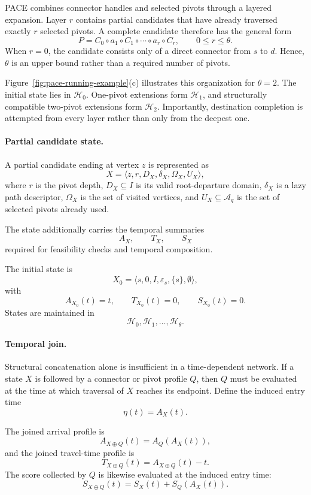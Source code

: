 \documentclass[a4paper,fleqn]{cas-dc}
\begin{document}
PACE combines connector handles and selected pivots through a layered
expansion. Layer \(r\) contains partial candidates that have already traversed
exactly \(r\) selected pivots. A complete candidate therefore has the general
form
\[
P
=
C_0\circ a_1\circ C_1
\circ\cdots\circ
a_r\circ C_r,
\qquad
0\leq r\leq\theta.
\]
When \(r=0\), the candidate consists only of a direct connector from \(s\) to
\(d\). Hence, \(\theta\) is an upper bound rather than a required number of
pivots.

Figure~\ref{fig:pace-running-example}(c) illustrates this organization for
\(\theta=2\). The initial state lies in \(\mathcal H_0\). One-pivot
extensions form \(\mathcal H_1\), and structurally compatible two-pivot
extensions form \(\mathcal H_2\). Importantly, destination completion is
attempted from every layer rather than only from the deepest one.

\paragraph{Partial candidate state.}
A partial candidate ending at vertex \(z\) is represented as
\[
X
=
\langle
z,r,D_X,\delta_X,\Omega_X,U_X
\rangle,
\]
where \(r\) is the pivot depth, \(D_X\subseteq I\) is its valid
root-departure domain, \(\delta_X\) is a lazy path descriptor,
\(\Omega_X\) is the set of visited vertices, and
\(U_X\subseteq\mathcal A_q\) is the set of selected pivots already used.

The state additionally carries the temporal summaries
\[
A_X,\qquad T_X,\qquad S_X
\]
required for feasibility checks and temporal composition.

The initial state is
\[
X_0
=
\langle
s,0,I,\varepsilon_s,\{s\},\emptyset
\rangle,
\]
with
\[
A_{X_0}(t)=t,
\qquad
T_{X_0}(t)=0,
\qquad
S_{X_0}(t)=0.
\]
States are maintained in
\[
\mathcal H_0,\mathcal H_1,\ldots,\mathcal H_\theta.
\]

\paragraph{Temporal join.}
Structural concatenation alone is insufficient in a time-dependent network.
If a state \(X\) is followed by a connector or pivot profile \(Q\), then \(Q\)
must be evaluated at the time at which traversal of \(X\) reaches its
endpoint. Define the induced entry time
\[
\eta(t)=A_X(t).
\]

The joined arrival profile is
\[
A_{X\oplus Q}(t)
=
A_Q(A_X(t)),
\]
and the joined travel-time profile is
\[
T_{X\oplus Q}(t)
=
A_{X\oplus Q}(t)-t.
\]
The score collected by \(Q\) is likewise evaluated at the induced entry time:
\[
S_{X\oplus Q}(t)
=
S_X(t)+S_Q(A_X(t)).
\]
\end{document}
